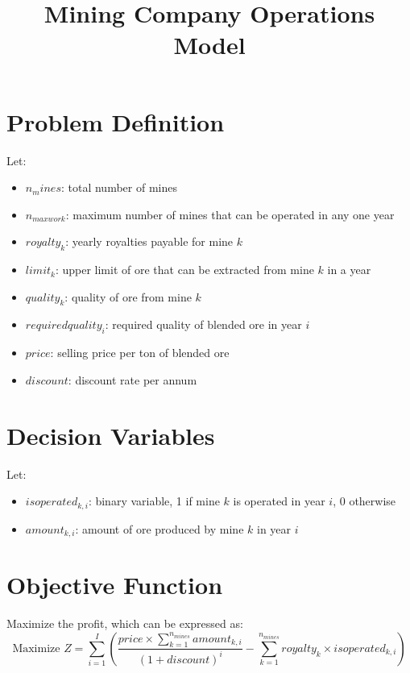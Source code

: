 \documentclass{article}
\begin{document}
\title{Mining Company Operations Model}
\author{}
\date{}
\maketitle

\section*{Problem Definition}

Let:
\begin{itemize}
    \item \( n_mines \): total number of mines
    \item \( n_{maxwork} \): maximum number of mines that can be operated in any one year
    \item \( royalty_k \): yearly royalties payable for mine \( k \)
    \item \( limit_k \): upper limit of ore that can be extracted from mine \( k \) in a year
    \item \( quality_k \): quality of ore from mine \( k \)
    \item \( requiredquality_i \): required quality of blended ore in year \( i \)
    \item \( price \): selling price per ton of blended ore
    \item \( discount \): discount rate per annum
\end{itemize}

\section*{Decision Variables}
Let:
\begin{itemize}
    \item \( isoperated_{k,i} \): binary variable, 1 if mine \( k \) is operated in year \( i \), 0 otherwise
    \item \( amount_{k,i} \): amount of ore produced by mine \( k \) in year \( i \)
\end{itemize}

\section*{Objective Function}
Maximize the profit, which can be expressed as:
\[
\text{Maximize } Z = \sum_{i=1}^{I} \left( \frac{price \times \sum_{k=1}^{n_{mines}} amount_{k,i}}{(1 + discount)^i} - \sum_{k=1}^{n_{mines}} royalty_k \times isoperated_{k,i} \right)
\]
\end{document}
